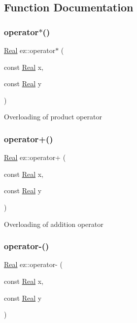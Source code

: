 \subsection{Function Documentation}
\mbox{\label{namespaceez_a904ed5e888a982c0f811c121b3024573}} 
\subsubsection{\texorpdfstring{operator$\ast$()}{operator*()}}
{\footnotesize\ttfamily \hyperlink{classez_1_1objects_1_1Real}{Real} ez\+::operator$\ast$ (\begin{DoxyParamCaption}\item[{const \hyperlink{classez_1_1objects_1_1Real}{Real}}]{x,  }\item[{const \hyperlink{classez_1_1objects_1_1Real}{Real}}]{y }\end{DoxyParamCaption})}

Overloading of product operator \mbox{\label{namespaceez_acf6a709c8dd01fd0f483d0e684a40960}} 
\subsubsection{\texorpdfstring{operator+()}{operator+()}}
{\footnotesize\ttfamily \hyperlink{classez_1_1objects_1_1Real}{Real} ez\+::operator+ (\begin{DoxyParamCaption}\item[{const \hyperlink{classez_1_1objects_1_1Real}{Real}}]{x,  }\item[{const \hyperlink{classez_1_1objects_1_1Real}{Real}}]{y }\end{DoxyParamCaption})}

Overloading of addition operator \mbox{\label{namespaceez_add78c19e69c5e85a255e290fb5beb5c7}} 
\subsubsection{\texorpdfstring{operator-\/()}{operator-()}}
{\footnotesize\ttfamily \hyperlink{classez_1_1objects_1_1Real}{Real} ez\+::operator-\/ (\begin{DoxyParamCaption}\item[{const \hyperlink{classez_1_1objects_1_1Real}{Real}}]{x,  }\item[{const \hyperlink{classez_1_1objects_1_1Real}{Real}}]{y }\end{DoxyParamCaption})}

